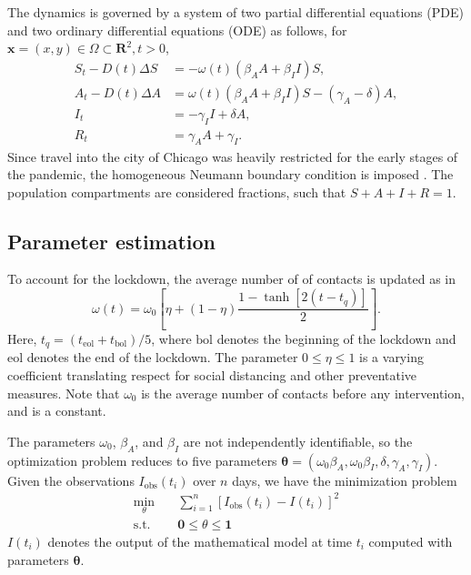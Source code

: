 \documentclass[11pt]{article}
\newcommand{\R}{\mathbf{R}}
\renewcommand\vec{\mathbf}
\begin{document}
		The dynamics is governed by a system of two partial differential equations (PDE) and two ordinary differential equations (ODE) as follows, for $\vec{x} = (x,y) \in \Omega \subset \R^2, t > 0$,
		\begin{equation} \label{eq:model}
			\begin{aligned}
				S_t - D(t) \Delta S &= - \omega(t) \left( \beta_A A + \beta_I I \right) S, \\
				A_t - D(t) \Delta A &= \omega(t) \left( \beta_A A + \beta_I I \right) S - (\gamma_A - \delta) A, \\
				I_t &= - \gamma_I I + \delta A, \\
				R_t &= \gamma_A A + \gamma_I.
			\end{aligned}
		\end{equation}
		Since travel into the city of Chicago was heavily restricted for the early stages of the pandemic, the homogeneous Neumann boundary condition is imposed \cite{Mammeri+2020+102+113}.
		The population compartments are considered fractions, such that $S + A + I + R = 1$.
	
	\subsection{Parameter estimation}
		To account for the lockdown, the average number of of contacts is updated as in  \cite{Kevrekidis-2021}
		\begin{equation} \label{eq:contacts}
			\omega (t) = \omega_0 \left[ \eta + (1 - \eta) \frac{1 - \tanh \left[2 (t - t_q) \right]}{2} \right].
		\end{equation}
		Here, $t_q = (t_{\mathrm{eol}} + t_{\mathrm{bol}}) / 5$, where $\mathrm{bol}$ denotes the beginning of the lockdown and $\mathrm{eol}$ denotes the end of the lockdown.
		The parameter $0 \leq \eta \leq 1$ is a varying coefficient translating respect for social distancing and other preventative measures.
		Note that $\omega_0$ is the average number of contacts before any intervention, and is a constant.
		
		The parameters $\omega_0$, $\beta_A$, and $\beta_I$ are not independently identifiable, so the optimization problem reduces to five parameters $\vec{\theta} = (\omega_0 \beta_A, \omega_0 \beta_I, \delta, \gamma_A, \gamma_I)$.
		Given the observations $I_\mathrm{obs} (t_i)$ over $n$ days, we have the minimization problem
		\begin{equation} \label{eq:obj}
			\begin{aligned}
				\min_\theta \quad & \sum_{i=1}^n \left[ I_\mathrm{obs} (t_i) - I (t_i) \right]^2 \\
				\textrm{s.t.} \quad & \vec{0} \leq \theta \leq \vec{1}
			\end{aligned}
		\end{equation}
		$I (t_i)$ denotes the output of the mathematical model at time $t_i$ computed with parameters $\vec{\theta}$.
		
\end{document}
